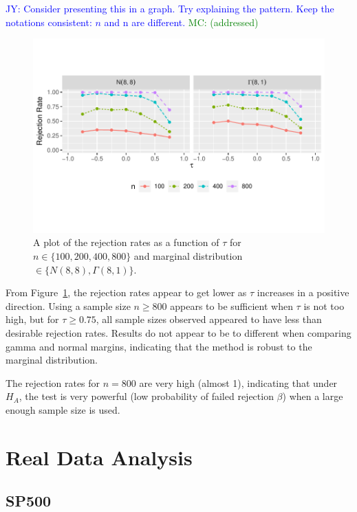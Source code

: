 \documentclass[12pt, titlepage, letterpaper]{article}
\newcommand{\jy}[1]{\textcolor{blue}{JY: #1}}
\newcommand{\mc}[1]{\textcolor{green}{MC: (#1)}}
\begin{document}
{\jy{Consider presenting this in a graph. Try explaining the pattern.
  Keep the notations consistent: $n$ and n are different.}
\mc{addressed}


\begin{figure}[tbp]
  \centering
  \includegraphics[scale=1]{figures/rr}
  \caption{A plot of the rejection rates as a function of $\tau$ for
 $n \in \{100, 200, 400, 800\}$ and marginal distribution 
 $\in \{N(8,8), \Gamma(8,1)\}$.}
  \label{fig:rr}
\end{figure}


From 
Figure~\ref{fig:rr}, 
the rejection rates appear to get lower as $\tau$ increases in a
positive direction. Using a sample size $n \geq 800$ appears to be sufficient
when $\tau$ is not too high, but for $\tau \geq 0.75$, all sample sizes 
observed appeared to have less than desirable rejection rates. Results
do not appear to be to different when comparing gamma and normal 
margins, indicating that the method is robust to the marginal distribution.


The rejection rates for $n = 800$
are very 
high (almost 1), indicating that under $H_A$, the test is very powerful 
(low probability of failed rejection $\beta$) when a large enough
sample size is used.


\section{Real Data Analysis}
\label{sec:real}


\subsection{SP500}
\label{sec:sp500}

}
\end{document}
